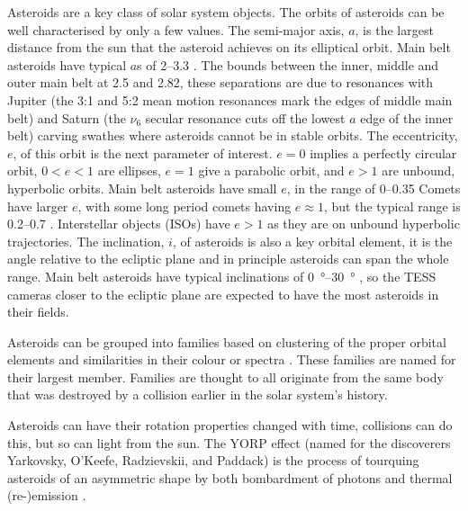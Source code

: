 \documentclass{UCreport}
\begin{document}
Asteroids are a key class of solar system objects.
The orbits of asteroids can be well characterised by only a few values. The semi-major axis, $a$, is the largest distance from the sun that the asteroid achieves on its elliptical orbit.
Main belt asteroids have typical $a$s of \qtyrange{2}{3.3}{\au} \citet{DeMeo2015}.
The bounds between the inner, middle and outer main belt at \qty{2.5}{\au} and \qty{2.82}{\au}, these separations are due to resonances with Jupiter (the 3:1 and 5:2 mean motion resonances mark the edges of middle main belt) and Saturn (the $\nu_6$ secular resonance cuts off the lowest $a$ edge of the inner belt) carving swathes where asteroids cannot be in stable orbits.
The eccentricity, $e$, of this orbit is the next parameter of interest. $e=0$ implies a perfectly circular orbit, $0<e<1$ are ellipses, $e=1$ give a parabolic orbit, and $e>1$ are unbound, hyperbolic orbits.
Main belt asteroids have small $e$, in the range of \qtyrange{0}{0.35}{} \citep{DeMeo2015}
Comets have larger $e$, with some long period comets having $e\approx 1$, but the typical range is \qtyrange{0.2}{0.7}{} \citep{Lewis2012}.
Interstellar objects (ISOs) have $e>1$ as they are on unbound hyperbolic trajectories.
The inclination, $i$, of asteroids is also a key orbital element, it is the angle relative to the ecliptic plane and in principle asteroids can span the whole range.
Main belt asteroids have typical inclinations of \qtyrange{0}{30}{\degree} \citep{DeMeo2015}, so the TESS cameras closer to the ecliptic plane are expected to have the most asteroids in their fields.


Asteroids can be grouped into families based on clustering of the proper orbital elements and similarities in their colour or spectra \citep{Nesvorny2015}.
These families are named for their largest member.
Families are thought to all originate from the same body that was destroyed by a collision earlier in the solar system's history.

Asteroids can have their rotation properties changed with time, collisions can do this, but so can light from the sun.
The YORP effect (named for the discoverers Yarkovsky, O'Keefe, Radzievskii, and Paddack) is the process of tourquing asteroids of an asymmetric shape by both bombardment of photons and thermal (re-)emission \citep{Rubincam2000}.
\end{document}
